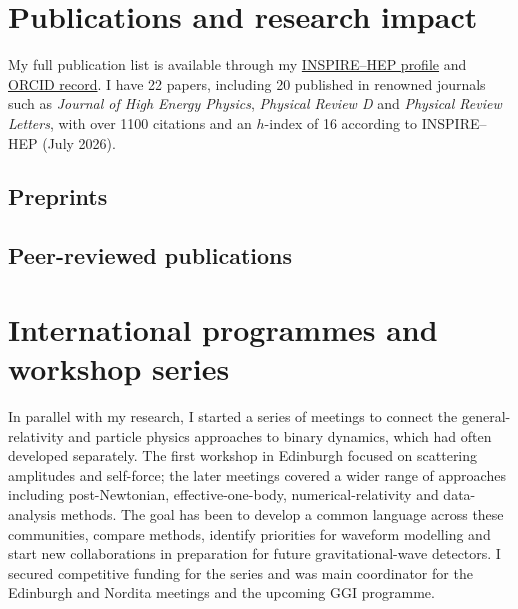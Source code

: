 \documentclass[11pt,a4paper,sans]{moderncv}
\begin{document}
\clearpage
\section{Publications and research impact}
My full publication list is available through my \href{https://inspirehep.net/authors/1812058?ui-citation-summary=true}{INSPIRE--HEP profile} and \href{https://orcid.org/0000-0001-7285-6295}{ORCID record}. I have 22 papers, including 20 published in renowned journals such as \emph{Journal of High Energy Physics}, \emph{Physical Review D} and \emph{Physical Review Letters}, with over 1100 citations and an $h$-index of 16 according to INSPIRE--HEP (July 2026).

\begin{refsection}
\nocite{Gonzo:2026yha,Alessio:2026bdi}
\subsection{Preprints}
{\footnotesize\printbibliography[heading=none]}
\end{refsection}

\begin{refsection}
\nocite{Barack:2026izc,Alessio:2025isu,Akpinar:2025tct,Alessio:2025flu,Akpinar:2025huz,Gonzo:2024xjk,Gonzo:2024zxo,Adamo:2024oxy,DeAngelis:2023lvf,Cristofoli:2021jas,Gonzo:2023cnv,Gonzo:2023goe,Adamo:2022ooq,Gonzo:2022tjm,Britto:2021pud,Cristofoli:2021vyo,Gonzo:2021drq,Gonzo:2020xza,Gonzo:2019fai,Banerjee:2020kaa}
\subsection{Peer-reviewed publications}
{\footnotesize\printbibliography[heading=none]}
\end{refsection}

\section{International programmes and workshop series}
In parallel with my research, I started a series of meetings to connect the general-relativity and particle physics approaches to binary dynamics, which had often developed separately. The first workshop in Edinburgh focused on scattering amplitudes and self-force; the later meetings covered a wider range of approaches including post-Newtonian, effective-one-body, numerical-relativity and data-analysis methods. The goal has been to develop a common language across these communities, compare methods, identify priorities for waveform modelling and start new collaborations in preparation for future gravitational-wave detectors. I secured competitive funding for the series and was main coordinator for the Edinburgh and Nordita meetings and the upcoming GGI programme.
\end{document}
